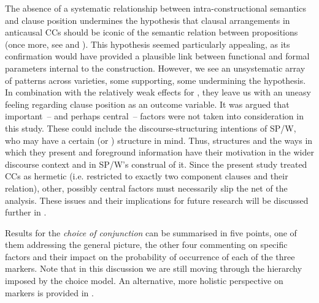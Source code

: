 The absence of a systematic relationship between intra-constructional semantics and clause position undermines the hypothesis that clausal arrangements in anticausal CCs should be iconic of the semantic relation between propositions (once more, see  and ‎). This hypothesis seemed particularly appealing, as its confirmation would have provided a plausible link between functional and formal parameters internal to the construction. However, we see an unsystematic array of patterns across varieties, some supporting, some undermining the hypothesis. In combination with the relatively weak effects for , they leave us with an uneasy feeling regarding clause position as an outcome variable. It was argued that important~– and perhaps central~– factors were not taken into consideration in this study. These could include the discourse-structuring intentions of SP/W, who may have a certain  (or ) structure in mind. Thus, structures and the ways in which they present and foreground information have their motivation in the wider discourse context and in SP/W’s construal of it. Since the present study treated CCs as hermetic (i.e. restricted to exactly two component clauses and their relation), other, possibly central factors must necessarily slip the net of the analysis. These issues and their implications for future research will be discussed further in .

Results for the \emph{choice of conjunction} can be summarised in five points, one of them addressing the general picture, the other four commenting on specific factors and their impact on the probability of occurrence of each of the three markers. Note that in this discussion we are still moving through the hierarchy imposed by the choice model. An alternative, more holistic perspective on markers is provided in .

